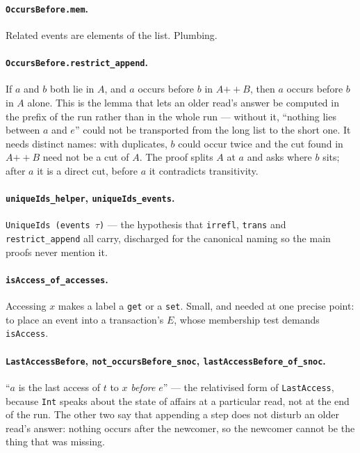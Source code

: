 \documentclass[11pt]{article}
\newcommand{\lean}[1]{\texttt{\small #1}}
\begin{document}
\paragraph{\lean{OccursBefore.mem}.}
Related events are elements of the list. Plumbing.

\paragraph{\lean{OccursBefore.restrict\_append}.}
If $a$ and $b$ both lie in $A$, and $a$ occurs before $b$ in $A \mathbin{+\!\!+} B$,
then $a$ occurs before $b$ in $A$ alone. This is the lemma that lets an older
read's answer be computed in the prefix of the run rather than in the whole run
--- without it, ``nothing lies between $a$ and $e$'' could not be transported
from the long list to the short one. It needs distinct names: with duplicates,
$b$ could occur twice and the cut found in $A \mathbin{+\!\!+} B$ need not be a cut
of $A$. The proof splits $A$ at $a$ and asks where $b$ sits; after $a$ it is a
direct cut, before $a$ it contradicts transitivity.

\paragraph{\lean{uniqueIds\_helper}, \lean{uniqueIds\_events}.}
\lean{UniqueIds (events $\tau$)} --- the hypothesis that \lean{irrefl},
\lean{trans} and \lean{restrict\_append} all carry, discharged for the canonical
naming so the main proofs never mention it.

\paragraph{\lean{isAccess\_of\_accesses}.}
Accessing $x$ makes a label a \lean{get} or a \lean{set}. Small, and needed at one
precise point: to place an event into a transaction's $E$, whose membership test
demands \lean{isAccess}.

\paragraph{\lean{LastAccessBefore}, \lean{not\_occursBefore\_snoc},
\lean{lastAccessBefore\_of\_snoc}.}
``$a$ is the last access of $t$ to $x$ \emph{before} $e$'' --- the relativised
form of \lean{LastAccess}, because \lean{Int} speaks about the state of affairs
at a particular read, not at the end of the run. The other two say that appending
a step does not disturb an older read's answer: nothing occurs after the newcomer,
so the newcomer cannot be the thing that was missing.
\end{document}
